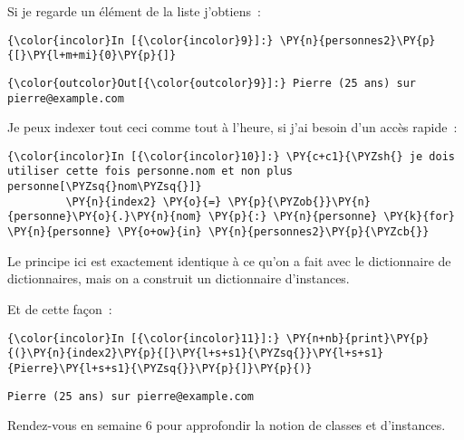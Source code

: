     Si je regarde un élément de la liste j'obtiens~:

    \begin{Verbatim}[commandchars=\\\{\},frame=single,framerule=0.3mm,rulecolor=\color{cellframecolor}]
{\color{incolor}In [{\color{incolor}9}]:} \PY{n}{personnes2}\PY{p}{[}\PY{l+m+mi}{0}\PY{p}{]}
\end{Verbatim}


\begin{Verbatim}[commandchars=\\\{\},frame=single,framerule=0.3mm,rulecolor=\color{cellframecolor}]
{\color{outcolor}Out[{\color{outcolor}9}]:} Pierre (25 ans) sur pierre@example.com
\end{Verbatim}
            
    Je peux indexer tout ceci comme tout à l'heure, si j'ai besoin d'un
accès rapide~:

    \begin{Verbatim}[commandchars=\\\{\},frame=single,framerule=0.3mm,rulecolor=\color{cellframecolor}]
{\color{incolor}In [{\color{incolor}10}]:} \PY{c+c1}{\PYZsh{} je dois utiliser cette fois personne.nom et non plus personne[\PYZsq{}nom\PYZsq{}]}
         \PY{n}{index2} \PY{o}{=} \PY{p}{\PYZob{}}\PY{n}{personne}\PY{o}{.}\PY{n}{nom} \PY{p}{:} \PY{n}{personne} \PY{k}{for} \PY{n}{personne} \PY{o+ow}{in} \PY{n}{personnes2}\PY{p}{\PYZcb{}}
\end{Verbatim}


    Le principe ici est exactement identique à ce qu'on a fait avec le
dictionnaire de dictionnaires, mais on a construit un dictionnaire
d'instances.

Et de cette façon~:

    \begin{Verbatim}[commandchars=\\\{\},frame=single,framerule=0.3mm,rulecolor=\color{cellframecolor}]
{\color{incolor}In [{\color{incolor}11}]:} \PY{n+nb}{print}\PY{p}{(}\PY{n}{index2}\PY{p}{[}\PY{l+s+s1}{\PYZsq{}}\PY{l+s+s1}{Pierre}\PY{l+s+s1}{\PYZsq{}}\PY{p}{]}\PY{p}{)}
\end{Verbatim}


    \begin{Verbatim}[commandchars=\\\{\},frame=single,framerule=0.3mm,rulecolor=\color{cellframecolor}]
Pierre (25 ans) sur pierre@example.com
\end{Verbatim}

    Rendez-vous en semaine 6 pour approfondir la notion de classes et
d'instances.


    
    
    
